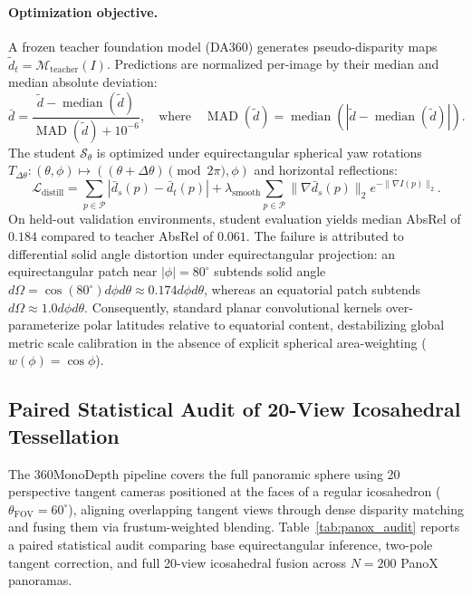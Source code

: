 \documentclass{article}
\newcommand{\absrel}{AbsRel}
\begin{document}
\paragraph{Optimization objective.} A frozen teacher foundation model (DA360) generates pseudo-disparity maps $\tilde{d}_t = \mathcal{M}_{\mathrm{teacher}}(I)$. Predictions are normalized per-image by their median and median absolute deviation:
\begin{equation}
\bar{d} = \frac{\tilde{d} - \operatorname{median}(\tilde{d})}{\operatorname{MAD}(\tilde{d}) + 10^{-6}}, \quad \text{where} \quad \operatorname{MAD}(\tilde{d}) = \operatorname{median}(|\tilde{d} - \operatorname{median}(\tilde{d})|).
\end{equation}
The student $\mathcal{S}_\theta$ is optimized under equirectangular spherical yaw rotations $T_{\Delta\theta}: (\theta, \phi) \mapsto ((\theta + \Delta\theta) \pmod{2\pi}, \phi)$ and horizontal reflections:
\begin{equation}
\mathcal{L}_{\mathrm{distill}} = \sum_{p \in \mathcal{P}} \left| \bar{d}_s(p) - \bar{d}_t(p) \right| + \lambda_{\mathrm{smooth}} \sum_{p \in \mathcal{P}} \|\nabla \bar{d}_s(p)\|_2 e^{-\|\nabla I(p)\|_2}.
\end{equation}
On held-out validation environments, student evaluation yields median \absrel{} of $0.184$ compared to teacher \absrel{} of $0.061$. The failure is attributed to differential solid angle distortion under equirectangular projection: an equirectangular patch near $|\phi| = 80^\circ$ subtends solid angle $d\Omega = \cos(80^\circ) d\phi d\theta \approx 0.174 d\phi d\theta$, whereas an equatorial patch subtends $d\Omega \approx 1.0 d\phi d\theta$. Consequently, standard planar convolutional kernels over-parameterize polar latitudes relative to equatorial content, destabilizing global metric scale calibration in the absence of explicit spherical area-weighting ($w(\phi) = \cos\phi$).

\subsection{Paired Statistical Audit of 20-View Icosahedral Tessellation}
The 360MonoDepth pipeline covers the full panoramic sphere using 20 perspective tangent cameras positioned at the faces of a regular icosahedron ($\theta_{\mathrm{FOV}} = 60^\circ$), aligning overlapping tangent views through dense disparity matching and fusing them via frustum-weighted blending. Table~\ref{tab:panox_audit} reports a paired statistical audit comparing base equirectangular inference, two-pole tangent correction, and full 20-view icosahedral fusion across $N=200$ PanoX panoramas.
\end{document}
